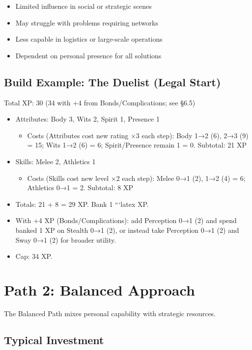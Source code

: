 \documentclass[11pt,twoside,openany]{book}
\begin{document}
\begin{itemize}
\item Limited influence in social or strategic scenes
\item May struggle with problems requiring networks
\item Less capable in logistics or large-scale operations
\item Dependent on personal presence for all solutions
\end{itemize}

\subsection*{Build Example: The Duelist (Legal Start)}

Total XP: 30 (34 with +4 from Bonds/Complications; see §6.5)

\begin{itemize}
\item Attributes: Body 3, Wits 2, Spirit 1, Presence 1
\begin{itemize}
\item Costs (Attributes cost new rating ×3 each step): Body 1→2 (6), 2→3 (9) = 15; Wits 1→2 (6) = 6; Spirit/Presence remain 1 = 0. Subtotal: 21 XP
\end{itemize}
\item Skills: Melee 2, Athletics 1
\begin{itemize}
\item Costs (Skills cost new level ×2 each step): Melee 0→1 (2), 1→2 (4) = 6; Athletics 0→1 = 2. Subtotal: 8 XP
\end{itemize}
\item Totals: 21 + 8 = 29 XP. Bank 1
```latex
 XP.
\item With +4 XP (Bonds/Complications): add Perception 0→1 (2) and spend banked 1 XP on Stealth 0→1 (2), or instead take Perception 0→1 (2) and Sway 0→1 (2) for broader utility.
\item Cap: 34 XP.
\end{itemize}

\section*{Path 2: Balanced Approach} 

The Balanced Path mixes personal capability with strategic resources.

\subsection*{Typical Investment}
\end{document}
